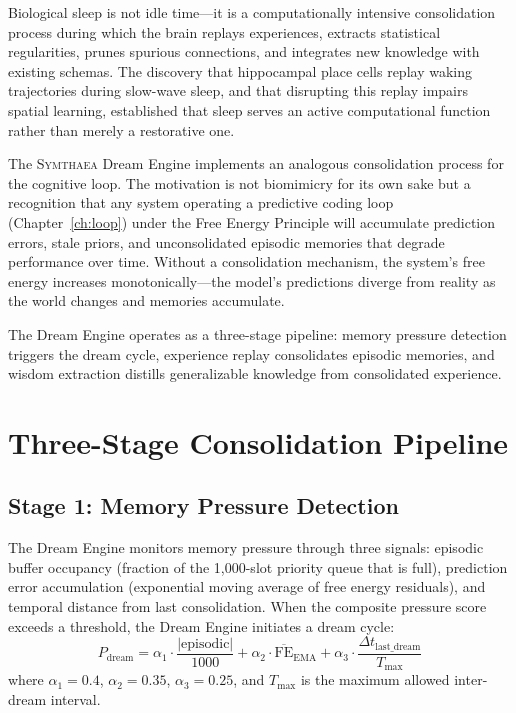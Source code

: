 \documentclass[12pt]{book}
\newcommand{\symthaea}{\textsc{Symthaea}}
\begin{document}
Biological sleep is not idle time---it is a computationally intensive consolidation process during which the brain replays experiences, extracts statistical regularities, prunes spurious connections, and integrates new knowledge with existing schemas. The discovery that hippocampal place cells replay waking trajectories during slow-wave sleep, and that disrupting this replay impairs spatial learning, established that sleep serves an active computational function rather than merely a restorative one.

The \symthaea{} Dream Engine implements an analogous consolidation process for the cognitive loop. The motivation is not biomimicry for its own sake but a recognition that any system operating a predictive coding loop (Chapter~\ref{ch:loop}) under the Free Energy Principle will accumulate prediction errors, stale priors, and unconsolidated episodic memories that degrade performance over time. Without a consolidation mechanism, the system's free energy increases monotonically---the model's predictions diverge from reality as the world changes and memories accumulate.

The Dream Engine operates as a three-stage pipeline: memory pressure detection triggers the dream cycle, experience replay consolidates episodic memories, and wisdom extraction distills generalizable knowledge from consolidated experience.

\section{Three-Stage Consolidation Pipeline}

\subsection{Stage 1: Memory Pressure Detection}

The Dream Engine monitors memory pressure through three signals: episodic buffer occupancy (fraction of the 1,000-slot priority queue that is full), prediction error accumulation (exponential moving average of free energy residuals), and temporal distance from last consolidation. When the composite pressure score exceeds a threshold, the Dream Engine initiates a dream cycle:
\begin{equation}
P_{\text{dream}} = \alpha_1 \cdot \frac{|\text{episodic}|}{1000} + \alpha_2 \cdot \overline{\text{FE}}_{\text{EMA}} + \alpha_3 \cdot \frac{\Delta t_{\text{last\_dream}}}{T_{\text{max}}}
\end{equation}
where $\alpha_1 = 0.4$, $\alpha_2 = 0.35$, $\alpha_3 = 0.25$, and $T_{\text{max}}$ is the maximum allowed inter-dream interval.
\end{document}
